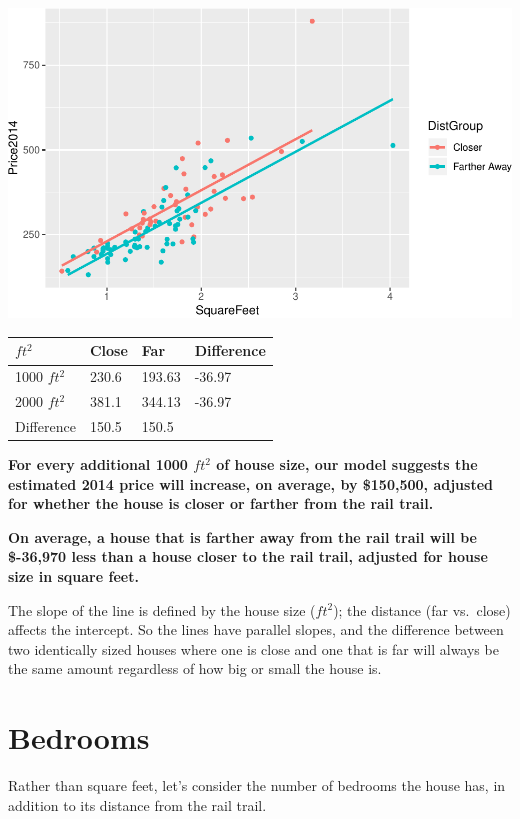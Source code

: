 \documentclass[]{article}
\begin{document}
\includegraphics{09_InClass_Answers_files/figure-latex/unnamed-chunk-8-1.pdf}

\vspace{0.5 in}

\begin{longtable}[]{@{}llll@{}}
\toprule
\(ft^2\) & Close & Far & Difference\tabularnewline
\midrule
\endhead
1000 \(ft^2\) & 230.6 & 193.63 & -36.97\tabularnewline
2000 \(ft^2\) & 381.1 & 344.13 & -36.97\tabularnewline
Difference & 150.5 & 150.5 &\tabularnewline
\bottomrule
\end{longtable}

\textbf{For every additional 1000 \(ft^2\) of house size, our model
suggests the estimated 2014 price will increase, on average, by
\$150,500, adjusted for whether the house is closer or farther from the
rail trail.}

\textbf{On average, a house that is farther away from the rail trail
will be \$-36,970 less than a house closer to the rail trail, adjusted
for house size in square feet.}

The slope of the line is defined by the house size (\(ft^2\)); the
distance (far vs.~close) affects the intercept. So the lines have
parallel slopes, and the difference between two identically sized houses
where one is close and one that is far will always be the same amount
regardless of how big or small the house is.

\hypertarget{bedrooms}{%
\section{Bedrooms}\label{bedrooms}}

Rather than square feet, let's consider the number of bedrooms the house
has, in addition to its distance from the rail trail.
\end{document}
